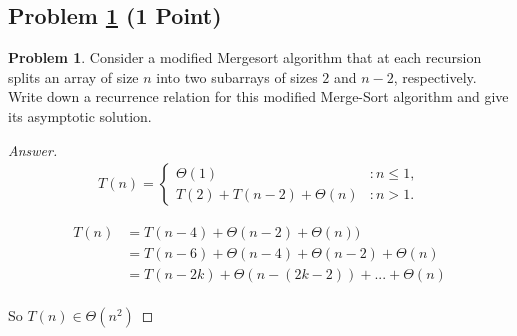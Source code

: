 \documentclass[11pt]{article}
\theoremstyle{definition}
\theoremstyle{definition}
\newtheorem{required}{Problem}
\theoremstyle{definition}
\begin{document}
\subsection{Problem \ref{modmergetime2} (1 Point)}
\begin{required}\label{modmergetime2}
Consider a modified Mergesort algorithm that at each recursion splits an array of size $n$ into two subarrays of sizes $2$ and $n-2$, respectively. Write down a recurrence relation for this modified Merge-Sort algorithm and give its asymptotic solution.

\begin{proof}[Answer]
\begin{align*}
T(n) = \begin{cases}
\Theta(1) & : n \leq 1, \\
T(2) + T(n-2) + \Theta(n) & : n > 1.
\end{cases}
\end{align*}

\begin{align*}
	T(n) &= T(n-4) + \Theta(n-2) + \Theta(n))\\
	&= T(n - 6) + \Theta(n - 4) + \Theta(n - 2) + \Theta(n)\\
	&= T(n - 2k) + \Theta(n - (2k - 2)) + ... + \Theta(n)
\end{align*}\\

So $T(n) \in \Theta(n^2)$
\end{proof}
\end{required}

\newpage
\end{document}
